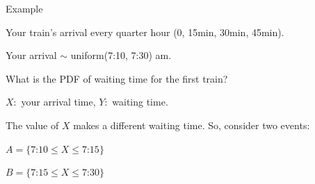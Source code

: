 \begin{frame}{Example }

{

\bigskip


\plitemsep 0.1in
\bci 
\item<1-> Your train's arrival every quarter hour (0, 15min, 30min, 45min). 

\item<1-> Your arrival $\sim$ uniform(7:10, 7:30) am. 

\item<2-> What is the PDF of waiting time for the first train?

\item<3-> $X:$ your arrival time, $Y:$ waiting time.

\item<4-> The value of $X$ makes a different waiting time. So, consider two events:

\medskip
$A = \{\text{7:10} \leq X \leq \text{7:15} \}$

\medskip
$B = \{\text{7:15} \leq X \leq \text{7:30} \}$

\eci
}
{
\small
{}
}

\end{frame}

